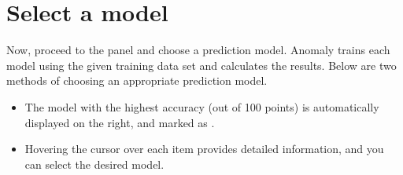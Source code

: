 \documentclass[letterpaper,10pt,english]{sphinxmanual}
\begin{document}
\section{Select a model}
\label{\detokenize{anomaly/part02/index:select-model}}\label{\detokenize{anomaly/part02/index:id5}}
Now, proceed to the  panel and choose a prediction model. Anomaly trains each model using the given training data set and calculates the results. Below are two methods of choosing an appropriate prediction model.
\begin{itemize}
\item {} 
The model with the highest accuracy (out of 100 points) is automatically displayed on the right, and marked as .
\begin{quote}

\begin{figure}[H]
\centering

\noindent{}
\end{figure}
\end{quote}

\item {} 
Hovering the cursor over each item provides detailed information, and you can select the desired model.
\begin{quote}

\begin{figure}[H]
\centering

\noindent{}
\end{figure}
\end{quote}

\end{itemize}
\end{document}
